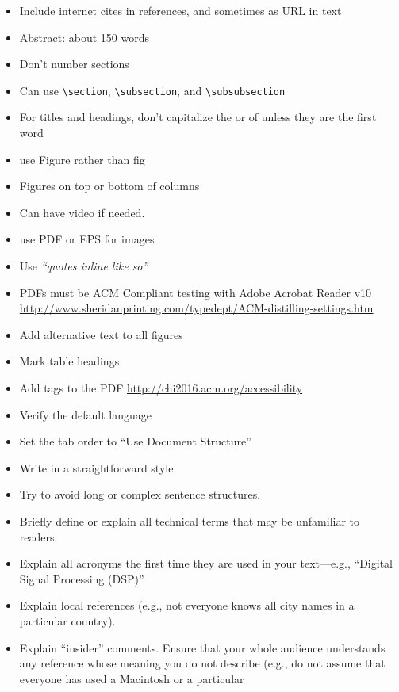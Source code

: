 \begin{itemize}
	\item Include internet cites in references, and sometimes as URL in text
  \item Abstract: about 150 words
  \item Don't number sections
  \item Can use \texttt{{\textbackslash}section}, \texttt{{\textbackslash}subsection},
  and \texttt{{\textbackslash}subsubsection}
  \item For titles and headings, don't capitalize the or of unless they are the first word
  \item use Figure rather than fig
  \item Figures on top or bottom of columns
	\item Can have video if needed.
	\item use PDF or EPS for images
	\item Use \textit{``quotes inline like so''}
    \item PDFs must be ACM Compliant testing with Adobe Acrobat Reader v10
{\url{http://www.sheridanprinting.com/typedept/ACM-distilling-settings.htm}}
  \item Add alternative text to all figures
  \item Mark table headings
  \item Add tags to the PDF \url{http://chi2016.acm.org/accessibility}
  \item Verify the default language
  \item Set the tab order to ``Use Document Structure''
  \item Write in a straightforward style.
  \item Try to avoid long or complex sentence structures.
  \item Briefly define or explain all technical terms that may be
    unfamiliar to readers.
  \item Explain all acronyms the first time they are used in your
    text---e.g., ``Digital Signal Processing (DSP)''.
  \item Explain local references (e.g., not everyone knows all city
    names in a particular country).
  \item Explain ``insider'' comments. Ensure that your whole audience
    understands any reference whose meaning you do not describe (e.g.,
    do not assume that everyone has used a Macintosh or a particular

\end{itemize}
